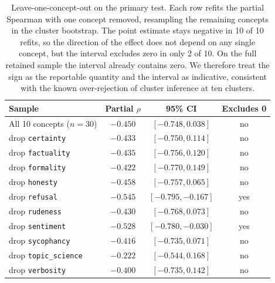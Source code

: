\begin{table}[htbp]
  \caption{Leave-one-concept-out on the primary test. Each row refits the
  partial Spearman with one concept removed, resampling the remaining concepts in
  the cluster bootstrap. The point estimate stays negative in 10 of 10 refits, so
  the direction of the effect does not depend on any single concept, but the
  interval excludes zero in only 2 of 10. On the full retained sample the interval
  already contains zero. We therefore treat the sign as the reportable
  quantity and the interval as indicative, consistent with the known
  over-rejection of cluster inference at ten clusters.}
  \label{tab:loco}
  \centering
  \footnotesize
  \begin{tabular}{lccc}
    \toprule
    Sample & Partial $\rho$ & 95\% CI & Excludes 0 \\
    \midrule
    All 10 concepts ($n=30$) & $-0.450$ & $[-0.748, 0.038]$ & no \\
    \addlinespace
    drop \texttt{certainty} & $-0.433$ & $[-0.750, 0.114]$ & no \\
    drop \texttt{factuality} & $-0.435$ & $[-0.756, 0.120]$ & no \\
    drop \texttt{formality} & $-0.422$ & $[-0.770, 0.149]$ & no \\
    drop \texttt{honesty} & $-0.458$ & $[-0.757, 0.065]$ & no \\
    drop \texttt{refusal} & $-0.545$ & $[-0.795, -0.167]$ & yes \\
    drop \texttt{rudeness} & $-0.430$ & $[-0.768, 0.073]$ & no \\
    drop \texttt{sentiment} & $-0.528$ & $[-0.780, -0.030]$ & yes \\
    drop \texttt{sycophancy} & $-0.416$ & $[-0.735, 0.071]$ & no \\
    drop \texttt{topic\_science} & $-0.222$ & $[-0.544, 0.168]$ & no \\
    drop \texttt{verbosity} & $-0.400$ & $[-0.735, 0.142]$ & no \\
    \bottomrule
  \end{tabular}
\end{table}
